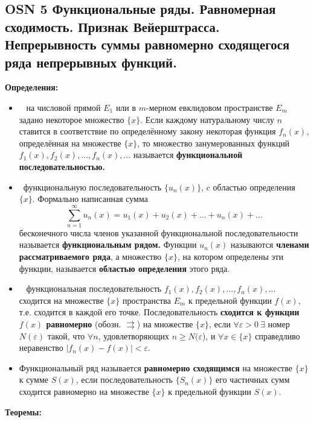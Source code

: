 \subsection*{OSN 5 Функциональные ряды. Равномерная сходимость. Признак Вейерштрасса. Непрерывность суммы  равномерно сходящегося ряда непрерывных функций.}

\textbf{Определения:}
\begin{itemize}
    \item \mathLet ~ на числовой прямой $E_1$ или в $m$-мерном евклидовом пространстве $E_m$ задано некоторое множество $\{x\}$.
    Если каждому натуральному числу $n$ ставится в соответствие по определённому закону некоторая функция $f_n(x)$, определённая на множестве $\{x\}$, то множество занумерованных функций $f_1(x),f_2(x),\dots,f_n(x),\dots$ называется \textbf{функциональной последовательностью.}
    
    \item \faEye \ функциональную последовательность $\{u_n(x)\}$, c областью определения $\{x\}$.
    Формально написанная сумма
    $$\displaystyle \sum_{n=1}^{\infty} u_n(x) = u_1(x) + u_2(x) + \dots + u_n(x) + \dots$$
    бесконечного числа членов указанной функциональной последовательности называется \textbf{функциональным рядом.}
    Функции $u_n(x)$ называются \textbf{членами рассматриваемого ряда}, а множество $\{x\}$, на котором определены эти функции, называется \textbf{областью определения} этого ряда.
    
    \item  \mathLet ~ функциональная последовательность
    $f_1(x), f_2(x), \dots, f_n(x), \dots$ сходится на множестве $\{x\}$ пространства $E_m$ к предельной функции $f(x)$, т.е. сходится в каждой его точке.
    Последовательность \textbf{сходится к функции $f(x)$ равномерно} (обозн. $\rightrightarrows$) на множестве $\{x\}$, если $\forall \varepsilon > 0 ~ \exists$ номер $N(\varepsilon)$ такой, что $\forall n$, удовлетворяющих $n \geqslant N(\varepsilon$), и $\forall x \in \{x\}$ справедливо неравенство $|f_n(x) - f(x)| < \varepsilon$.
    
    \item Функциональный ряд называется \textbf{равномерно сходящимся} на множестве $\{x\}$ к сумме $S(x)$, если последовательность $\{S_n(x)\}$ его частичных сумм сходится равномерно на множестве $\{x\}$ к предельной функции $S(x)$.

\end{itemize}


\textbf{Теоремы:}

